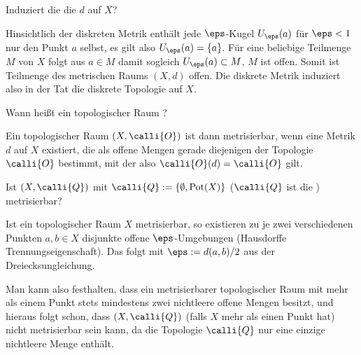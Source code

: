 \begin{frage}\label{08_diskto}
  Induziert die  
  die  $d$ auf $X$?
\end{frage}

\begin{antwort}
  Hinsichtlich der diskreten Metrik enthält jede $\eps$-Kugel $U_\eps(a)$ 
  für $\eps<1$ nur den Punkt $a$ selbst, es gilt also $U_\eps(a)=\{ a \}$. 
  Für eine beliebige Teilmenge $M$ von $X$ folgt aus $a\in M$ damit 
  sogleich $U_\eps(a)\subset M$, {\dasheisst} $M$ ist 
  offen. Somit ist  Teilmenge des metrischen Raums $(X,d)$ 
  offen. Die diskrete Metrik induziert also 
  in der Tat die diskrete Topologie auf $X$.
  \AntEnd
\end{antwort}

\begin{frage}
  Wann heißt ein topologischer Raum ?
\end{frage}

\begin{antwort}
  Ein topologischer Raum $(X,\calli{O})$ ist dann metrisierbar, wenn 
  eine Metrik $d$ auf $X$ existiert, die als offene Mengen 
  gerade diejenigen der Topologie $\calli{O}$ bestimmt,  
  mit der also $\calli{O}(d)=\calli{O}$ gilt.
  \AntEnd
\end{antwort}

\begin{frage}
  Ist $(X, \calli{Q})$ mit $\calli{Q} := \{ \emptyset, \mathrm{Pot}(X) \}$ 
  ($\calli{Q}$ ist die ) metrisierbar?
\end{frage}

\begin{antwort}
  
  Ist ein topologischer Raum $X$ metrisierbar, 
  so existieren zu je zwei verschiedenen 
  Punkten $a,b\in X$ disjunkte offene $\eps$-Umgebungen 
  (Hausdorff\sch e Trennungseigenschaft). Das folgt 
  mit $\eps := d(a,b)/2$ aus der Dreiecksungleichung. 

  Man kann also festhalten, dass ein metrisierbarer topologischer Raum mit
  mehr als einem Punkt stets mindestens zwei 
  nichtleere offene Mengen besitzt, und hieraus folgt schon, dass 
  $(X,\calli{Q})$ (falls $X$ mehr als einen Punkt hat) 
  nicht metrisierbar sein kann, da die Topologie $\calli{Q}$ nur eine 
  einzige nichtleere Menge enthält.   \AntEnd
\end{antwort}

